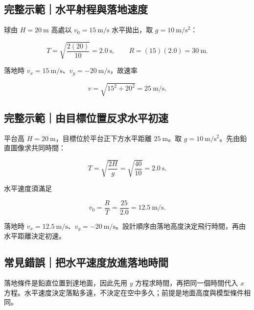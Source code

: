 \documentclass[11pt,a4paper]{article}
\begin{document}
\begin{HandoutWorkedExample}

\subsection{完整示範｜水平射程與落地速度}\label{ux5b8cux6574ux793aux7bc4ux6c34ux5e73ux5c04ux7a0bux8207ux843dux5730ux901fux5ea6}

球由 \(H=20\ \mathrm{m}\) 高處以 \(v_0=15\ \mathrm{m/s}\) 水平拋出，取 \(g=10\ \mathrm{m/s^2}\)：

\[
T=\sqrt{\frac{2(20)}{10}}=2.0\ \mathrm{s},
\qquad
R=(15)(2.0)=30\ \mathrm{m}.
\]

落地時 \(v_x=15\ \mathrm{m/s}\)、\(v_y=-20\ \mathrm{m/s}\)，故速率

\[
v=\sqrt{15^2+20^2}=25\ \mathrm{m/s}.
\]

\end{HandoutWorkedExample}

\begin{HandoutWorkedExample}

\subsection{完整示範｜由目標位置反求水平初速}\label{ux5b8cux6574ux793aux7bc4ux7531ux76eeux6a19ux4f4dux7f6eux53cdux6c42ux6c34ux5e73ux521dux901f}

平台高 \(H=20\ \mathrm m\)，目標位於平台正下方水平距離 \(25\ \mathrm m\)。取 \(g=10\ \mathrm{m/s^2}\)。先由鉛直圖像求共同時間：

\[
T=\sqrt{\frac{2H}{g}}=\sqrt{\frac{40}{10}}=2.0\ \mathrm s.
\]

水平速度須滿足

\[
v_0=\frac{R}{T}=\frac{25}{2.0}=12.5\ \mathrm{m/s}.
\]

落地時 \(v_x=12.5\ \mathrm{m/s}\)、\(v_y=-20\ \mathrm{m/s}\)。設計順序由落地高度決定飛行時間，再由水平距離決定初速。

\end{HandoutWorkedExample}

\subsection{常見錯誤｜把水平速度放進落地時間}\label{ux5e38ux898bux932fux8aa4ux628aux6c34ux5e73ux901fux5ea6ux653eux9032ux843dux5730ux6642ux9593}

落地條件是鉛直位置到達地面，因此先用 \(y\) 方程求時間，再把同一個時間代入 \(x\) 方程。水平速度決定落點多遠，不決定在空中多久；前提是地面高度與模型條件相同。
\end{document}
